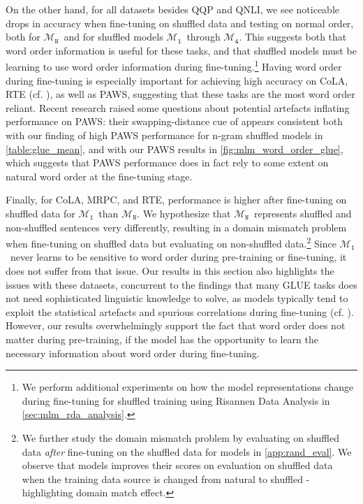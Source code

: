 \documentclass[letterpaper, 12pt]{report}
\newcommand{\OR}{$\mathcal{M}_{\texttt{N}}$}
\newcommand{\RI}{$\mathcal{M}_{\texttt{1}}$}
\newcommand{\RIV}{$\mathcal{M}_{\texttt{4}}$}
\begin{document}
On the other hand, for all datasets besides QQP and QNLI, we see noticeable drops in accuracy when fine-tuning on shuffled data and testing on normal order, both for \OR\ and for shuffled models \RI\ through \RIV.
This suggests both that word order information is useful for these tasks, and that shuffled models must be learning to use word order information during fine-tuning.\footnote{We perform additional experiments on how the model representations change during fine-tuning for shuffled training using Risannen Data Analysis in \autoref{sec:mlm_rda_analysis}.}
Having word order during fine-tuning is especially important for achieving high accuracy on CoLA, RTE (cf. \citealt{pham2020}), as well as PAWS,
suggesting that these tasks are the most word order reliant. Recent research \cite{yu-ettinger-2021-interplay} raised some questions about potential artefacts inflating performance on PAWS: their swapping-distance cue of appears consistent both with our finding of high PAWS performance for n-gram shuffled models in \autoref{table:glue_mean}, and with our PAWS results in \autoref{fig:mlm_word_order_glue}, which suggests that PAWS performance does in fact rely to some extent on natural word order  at the fine-tuning stage.

Finally, for CoLA, MRPC, and RTE, performance is higher after fine-tuning on shuffled data for \RI\ than \OR.
We hypothesize that \OR\ represents shuffled and non-shuffled sentences very differently, resulting in a domain mismatch problem when fine-tuning on shuffled data but evaluating on non-shuffled data.\footnote{We further study the domain mismatch problem by evaluating on shuffled data \textit{after} fine-tuning on the shuffled data for models in \autoref{app:rand_eval}. We observe that models improves their scores on evaluation on shuffled data when the training data source is changed from natural to shuffled - highlighting domain match effect.} Since \RI\ never learns to be sensitive to word order during pre-training or fine-tuning, it does not suffer from that issue. Our results in this section also highlights the issues with these datasets, concurrent to the findings that many GLUE tasks does not need sophisticated linguistic knowledge to solve, as models typically tend to exploit the statistical artefacts and spurious correlations during fine-tuning (cf. \citealt{gururangan-etal-2018-annotation, poliak-etal-2018-hypothesis,tsuchiya-2018-performance,mccoy-etal-2019-right}). However, our results overwhelmingly support the fact that word order does not matter during pre-training, if the model has the opportunity to learn the necessary information about word order during fine-tuning.
\end{document}
